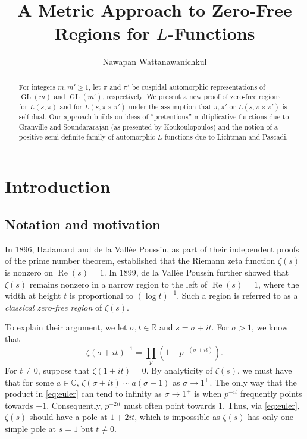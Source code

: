 \documentclass[12pt,reqno]{amsart}
\theoremstyle{remark}
\DeclareMathOperator{\GL}{GL}
\DeclareMathOperator{\Real}{Re}
\numberwithin{equation}{section}
\begin{document}
  
	\title[Metric approach to zero-free regions]{A Metric Approach to Zero-Free Regions for $L$-Functions}

  \author{Nawapan Wattanawanichkul}
	
	\address[Nawapan Wattanawanichkul]{1409 West Green Street, University of Illinois Urbana-Champaign, Urbana, IL 61801, USA}
    
	
	\begin{abstract}
    For integers $m,m' \ge 1$, let $\pi$ and $\pi'$ be cuspidal automorphic representations of $\GL(m)$ and $\GL(m')$, respectively. We present a new proof of zero-free regions for $L(s, \pi)$ and for $L(s, \pi \times \pi')$  under the assumption that $\pi, \pi'$ or $L(s,\pi \times \pi')$ is self-dual. Our approach builds on ideas of ``pretentious'' multiplicative functions due to Granville and Soundararajan (as presented by Koukoulopoulos)  and the notion of a positive semi-definite family of automorphic $L$-functions due to Lichtman and Pascadi.
    \end{abstract}
        
    
    \maketitle
    
	\section{Introduction}
	
	\subsection{Notation and motivation} In 1896, Hadamard and de la Vall\'ee Poussin, as part of their independent proofs of the prime number theorem, established that the Riemann zeta function $\zeta(s)$ is nonzero on $\Real(s)=1$.  In 1899, de la Vallée Poussin further showed that 
	$\zeta(s)$ remains nonzero in a narrow region to the left of $\Real(s)=1$, where the width at height 
	$t$ is proportional to $(\log t)^{-1}$. Such a region is referred to as a \textit{classical zero-free region} of $\zeta(s)$. 
	
	To explain their argument, we let $\sigma, t \in \mathbb{R}$ and  $s= \sigma+it$. For $\sigma >1$, we know that
\begin{equation}\label{eq:euler}
		{\zeta(\sigma +it)}^{-1} = \prod_{p}\left(1- {p^{-(\sigma+it)}}\right).
	\end{equation}
	For $t \neq 0$, suppose that $\zeta(1+it) = 0$. By analyticity of $\zeta(s)$, we must have that for some $a\in \mathbb{C}$, $\zeta(\sigma+it) \sim a(\sigma-1)$ as $\sigma \to 1^+$.
	The only way that the product in \eqref{eq:euler} can tend to infinity as $\sigma \to 1^{+}$ is when $p^{-it}$ frequently points towards $-1$.  Consequently, $p^{-2it}$ must often point towards $1$. Thus, via \eqref{eq:euler}, $\zeta(s)$ should have a pole at $1+2it$, which is impossible as $\zeta(s)$ has only one simple pole at $s=1$ but $t \neq 0$. 
	
\end{document}

